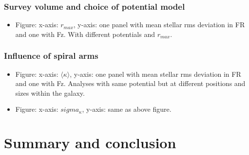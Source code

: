 \documentclass[iop,revtex4,numberedappendix,appendixfloats]{emulateapj}
\begin{document}
\subsubsection{Survey volume and choice of potential model}

\begin{itemize}
\item Figure: x-axis: $r_{max}$, y-axis: one panel with mean stellar rms deviation in FR and one with Fz. With different potentials and $r_{max}$.
\end{itemize}

\subsubsection{Influence of spiral arms}

\begin{itemize}
\item Figure: x-axis: $\langle \kappa \rangle$, y-axis: one panel with mean stellar rms deviation in FR and one with Fz. Analyses with same potential but at different positions and sizes within the galaxy.
\item Figure: x-axis: $sigma_\kappa$, y-axis: same as above figure.
\end{itemize}

\section{Summary and conclusion}

{}

\end{document}
